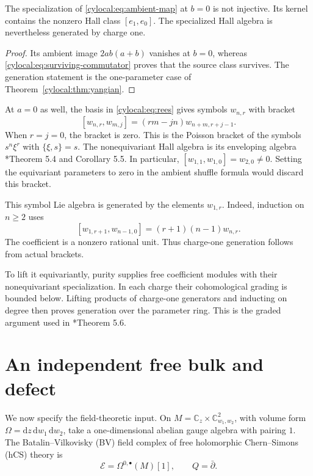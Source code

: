 \begin{proposition}\label{cylocal:prop:specialization-kernel}
The specialization of \eqref{cylocal:eq:ambient-map} at $b=0$
is not injective. Its kernel contains the nonzero Hall class
$[e_1,e_0]$. The specialized Hall algebra is nevertheless generated
by charge one.
\end{proposition}
\begin{proof}
Its ambient image $2ab(a+b)$ vanishes at $b=0$, whereas
\eqref{cylocal:eq:surviving-commutator} proves that the source class
survives. The generation statement is the one-parameter case of
Theorem~\ref{cylocal:thm:yangian}.
\end{proof}

At $a=0$ as well, the basis in \eqref{cylocal:eq:rees} gives symbols
$w_{n,r}$ with bracket
\begin{equation}\label{cylocal:eq:symbol-bracket}
 [w_{n,r},w_{m,j}]=(rm-jn)w_{n+m,r+j-1}.
\end{equation}
When $r=j=0$, the bracket is zero. This is the Poisson bracket of
the symbols $s^n\xi^r$ with $\{\xi,s\}=s$.
The nonequivariant Hall algebra is its enveloping algebra
\cite{cylocal:Davison}*{Theorem 5.4 and Corollary 5.5}.
In particular, $[w_{1,1},w_{1,0}]=w_{2,0}\ne0$.
Setting the equivariant parameters to zero in the ambient shuffle
formula would discard this bracket.

This symbol Lie algebra is generated by the elements $w_{1,r}$.
Indeed, induction on $n\geq2$ uses
\[
 [w_{1,r+1},w_{n-1,0}]=(r+1)(n-1)w_{n,r}.
\]
The coefficient is a nonzero rational unit. Thus charge-one
generation follows from actual brackets.

To lift it equivariantly,
purity supplies free coefficient modules with their nonequivariant
specialization. In each charge their cohomological grading is
bounded below. Lifting products of charge-one generators and
inducting on degree then proves generation over the parameter
ring. This is the graded argument used in
\cite{cylocal:Davison}*{Theorem 5.6}.

\section{An independent free bulk and defect}
\label{cylocal:sec:free-bulk}

We now specify the field-theoretic input. On
$M=\mathbb C_z\times\mathbb C^2_{w_1,w_2}$, with volume form
$\Omega=\mathrm dz\,\mathrm dw_1\,\mathrm dw_2$, take a
one-dimensional abelian gauge algebra with pairing $1$.
The Batalin--Vilkovisky (BV) field complex of free holomorphic
Chern--Simons (hCS) theory is
\[
 \mathcal E=\Omega^{0,\bullet}(M)[1],\qquad Q=\bar\partial.
\]

